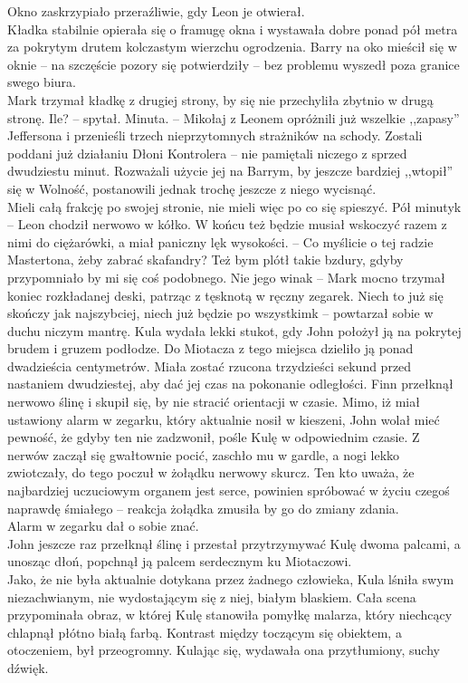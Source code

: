 \documentclass[../MAIN.tex]{subfiles}
\begin{document}
Okno zaskrzypiało przeraźliwie, gdy Leon je otwierał. \\
Kładka stabilnie opierała się o framugę okna i wystawała dobre ponad pół metra za pokrytym drutem kolczastym wierzchu ogrodzenia. Barry na oko mieścił się w oknie -- na szczęście pozory się potwierdziły -- bez problemu wyszedł poza granice swego biura. \\
Mark trzymał kładkę z drugiej strony, by się nie przechyliła zbytnio w drugą stronę.
\sx Ile? -- spytał.
\xx Minuta. -- Mikołaj z Leonem opróżnili już wszelkie ,,zapasy'' Jeffersona i przenieśli trzech nieprzytomnych strażników na schody.
\qd
Zostali poddani już działaniu Dłoni Kontrolera -- nie pamiętali niczego z sprzed dwudziestu minut. Rozważali użycie jej na Barrym, by jeszcze bardziej ,,wtopił'' się w Wolność, postanowili jednak trochę jeszcze z niego wycisnąć. \\
Mieli całą frakcję po swojej stronie, nie mieli więc po co się spieszyć.
\sx Pół minuty\3k -- Leon chodził nerwowo w kółko. W końcu też będzie musiał wskoczyć razem z nimi do ciężarówki, a miał paniczny lęk wysokości. -- Co myślicie o tej radzie Mastertona, żeby zabrać skafandry?
\xx Też bym plótł takie bzdury, gdyby przypomniało by mi się coś podobnego. Nie jego wina\3k -- Mark mocno trzymał koniec rozkładanej deski, patrząc z tęsknotą w ręczny zegarek. Niech to już się skończy jak najszybciej, niech już będzie po wszystkim\3k -- powtarzał sobie w duchu niczym mantrę.
\qd
Kula wydała lekki stukot, gdy John położył ją na pokrytej brudem i gruzem podłodze. Do Miotacza z tego miejsca dzieliło ją ponad dwadzieścia centymetrów. Miała zostać rzucona trzydzieści sekund przed nastaniem dwudziestej, aby dać jej czas na pokonanie odległości. Finn przełknął nerwowo ślinę i skupił się, by nie stracić orientacji w czasie. Mimo, iż miał ustawiony alarm w zegarku, który aktualnie nosił w kieszeni, John wolał mieć pewność, że gdyby ten nie zadzwonił, pośle Kulę w odpowiednim czasie. Z nerwów zaczął się gwałtownie pocić, zaschło mu w gardle, a nogi lekko zwiotczały, do tego poczuł w żołądku nerwowy skurcz. Ten kto uważa, że najbardziej uczuciowym organem jest serce, powinien spróbować w życiu czegoś naprawdę śmiałego -- reakcja żołądka zmusiła by go do zmiany zdania. \\
Alarm w zegarku dał o sobie znać.\\
John jeszcze raz przełknął ślinę i przestał przytrzymywać Kulę dwoma palcami, a unosząc dłoń, popchnął ją palcem serdecznym ku Miotaczowi. \\
Jako, że nie była aktualnie dotykana przez żadnego człowieka, Kula lśniła swym niezachwianym, nie wydostającym się z niej, białym blaskiem. Cała scena przypominała obraz, w której Kulę stanowiła pomyłkę malarza, który niechcący chlapnął płótno białą farbą. Kontrast między toczącym się obiektem, a otoczeniem, był przeogromny. Kulając się, wydawała ona przytłumiony, suchy dźwięk. \\
\end{document}

